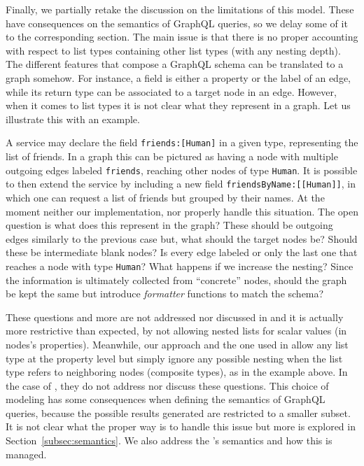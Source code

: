 Finally, we partially retake the discussion on the limitations of this model. These have consequences on the semantics of GraphQL queries, so we delay some of it to the corresponding section. The main issue is that there is no proper accounting with respect to list types containing other list types (with any nesting depth). The different features that compose a GraphQL schema can be translated to a graph somehow. For instance, a field is either a property or the label of an edge, while its return type can be associated to a target node in an edge. However, when it comes to list types it is not clear what they represent in a graph. Let us illustrate this with an example.

A service may declare the field \texttt{friends:[Human]} in a given type, representing the list of friends.
In a graph this can be pictured as having a node with multiple outgoing edges labeled \texttt{friends}, reaching other nodes of type \texttt{Human}. It is possible to then extend the service by including a new field \texttt{friendsByName:[[Human]]}, in which one can request a list of friends but grouped by their names. At the moment neither our implementation, \HP{} nor \cite{olafschema} properly handle this situation. The open question is what does this represent in the graph? These should be outgoing edges similarly to the previous case but, what should the target nodes be? Should these be intermediate blank nodes? Is every edge labeled or only the last one that reaches a node with type \texttt{Human}? What happens if we increase the nesting? Since the information is ultimately collected from ``concrete'' nodes, should the graph be kept the same but introduce \textit{formatter} functions to match the schema?

These questions and more are not addressed nor discussed in \HP{} and it is actually more restrictive than expected, by not allowing nested lists for scalar values (in nodes's properties). Meanwhile, our approach and the one used in \cite{olafschema} allow any list type at the property level but simply ignore any possible nesting when the list type refers to neighboring nodes (composite types), as in the example above. In the case of \cite{olafschema}, they do not address nor discuss these questions. This choice of modeling has some consequences when defining the semantics of GraphQL queries, because the possible results generated are restricted to a smaller subset. It is not clear what the proper way is to handle this issue but more is explored in Section~\ref{subsec:semantics}. We also address the \spec{}'s semantics and how this is managed.

